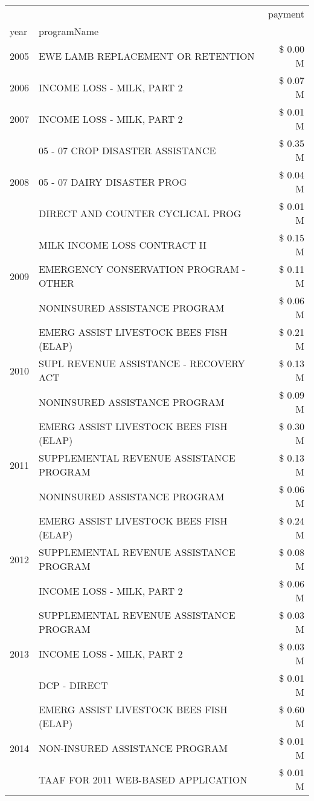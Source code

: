 \begin{tabular}{llr}
\toprule
 &  & payment \\
year & programName &  \\
\midrule
2005 & EWE LAMB REPLACEMENT OR RETENTION & \$ 0.00 M \\
\cline{1-3}
2006 & INCOME LOSS - MILK, PART 2 & \$ 0.07 M \\
\cline{1-3}
2007 & INCOME LOSS - MILK, PART 2 & \$ 0.01 M \\
\cline{1-3}
\multirow[t]{3}{*}{2008} & 05 - 07 CROP DISASTER ASSISTANCE & \$ 0.35 M \\
 & 05 - 07 DAIRY DISASTER PROG & \$ 0.04 M \\
 & DIRECT AND COUNTER CYCLICAL PROG & \$ 0.01 M \\
\cline{1-3}
\multirow[t]{3}{*}{2009} & MILK INCOME LOSS CONTRACT II & \$ 0.15 M \\
 & EMERGENCY CONSERVATION PROGRAM - OTHER & \$ 0.11 M \\
 & NONINSURED ASSISTANCE PROGRAM & \$ 0.06 M \\
\cline{1-3}
\multirow[t]{3}{*}{2010} & EMERG ASSIST LIVESTOCK BEES FISH (ELAP) & \$ 0.21 M \\
 & SUPL REVENUE ASSISTANCE - RECOVERY ACT & \$ 0.13 M \\
 & NONINSURED ASSISTANCE PROGRAM & \$ 0.09 M \\
\cline{1-3}
\multirow[t]{3}{*}{2011} & EMERG ASSIST LIVESTOCK BEES FISH (ELAP) & \$ 0.30 M \\
 & SUPPLEMENTAL REVENUE ASSISTANCE PROGRAM & \$ 0.13 M \\
 & NONINSURED ASSISTANCE PROGRAM & \$ 0.06 M \\
\cline{1-3}
\multirow[t]{3}{*}{2012} & EMERG ASSIST LIVESTOCK BEES FISH (ELAP) & \$ 0.24 M \\
 & SUPPLEMENTAL REVENUE ASSISTANCE PROGRAM & \$ 0.08 M \\
 & INCOME LOSS - MILK, PART 2 & \$ 0.06 M \\
\cline{1-3}
\multirow[t]{3}{*}{2013} & SUPPLEMENTAL REVENUE ASSISTANCE PROGRAM & \$ 0.03 M \\
 & INCOME LOSS - MILK, PART 2 & \$ 0.03 M \\
 & DCP - DIRECT & \$ 0.01 M \\
\cline{1-3}
\multirow[t]{3}{*}{2014} & EMERG ASSIST LIVESTOCK BEES FISH (ELAP) & \$ 0.60 M \\
 & NON-INSURED ASSISTANCE PROGRAM & \$ 0.01 M \\
 & TAAF FOR 2011 WEB-BASED APPLICATION & \$ 0.01 M \\

\end{tabular}
